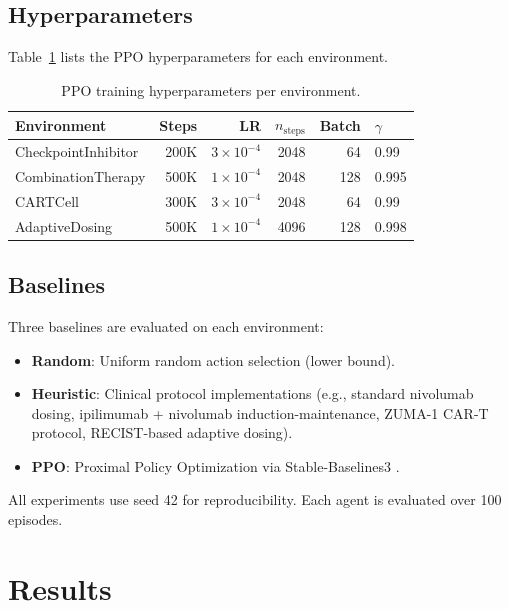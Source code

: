 \documentclass[11pt,a4paper]{article}
\begin{document}
\subsection{Hyperparameters}

Table~\ref{tab:hyperparams} lists the PPO hyperparameters for each environment.

\begin{table}[h]
\centering
\caption{PPO training hyperparameters per environment.}
\label{tab:hyperparams}
\begin{tabular}{lrrrrl}
\toprule
\textbf{Environment} & \textbf{Steps} & \textbf{LR} & \textbf{$n_{\text{steps}}$} & \textbf{Batch} & \textbf{$\gamma$} \\
\midrule
CheckpointInhibitor & 200K & $3 \times 10^{-4}$ & 2048 & 64 & 0.99 \\
CombinationTherapy & 500K & $1 \times 10^{-4}$ & 2048 & 128 & 0.995 \\
CARTCell & 300K & $3 \times 10^{-4}$ & 2048 & 64 & 0.99 \\
AdaptiveDosing & 500K & $1 \times 10^{-4}$ & 4096 & 128 & 0.998 \\
\bottomrule
\end{tabular}
\end{table}

\subsection{Baselines}

Three baselines are evaluated on each environment:
\begin{itemize}
    \item \textbf{Random}: Uniform random action selection (lower bound).
    \item \textbf{Heuristic}: Clinical protocol implementations (e.g., standard nivolumab dosing, ipilimumab + nivolumab induction-maintenance, ZUMA-1 CAR-T protocol, RECIST-based adaptive dosing).
    \item \textbf{PPO}: Proximal Policy Optimization \citep{Schulman2017} via Stable-Baselines3 \citep{Raffin2021}.
\end{itemize}

All experiments use seed 42 for reproducibility. Each agent is evaluated over 100 episodes.

\section{Results}
\end{document}
